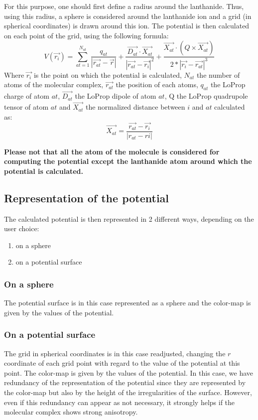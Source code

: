 \documentclass[12pt,a4paper]{article}
\begin{document}
For this purpose, one should first define a radius around the lanthanide. Thus, using this radius, a sphere is considered around the lanthanide ion and a grid (in spherical coordinates) is drawn around this ion. The potential is then calculated on each point of the grid, using the following formula:
\begin{equation}
V(\vec{r_i})=\sum_{at=1}^{N_{at}} \frac{q_{at}}{|\vec{r_{at}}-\vec{r}|} + \frac{\vec{D_{at}}\cdot{}\vec{X_{at}}}{|\vec{r_{at}}-\vec{r_i}|^2} + \frac{\vec{X_{at}}\cdot{}(Q\times\vec{X_{at}})}{2*|\vec{r_i}-\vec{r_{at}}|^3}
\end{equation}
Where $\vec{r_i}$ is the point on which the potential  is calculated, $N_{at}$ the number of atoms of the molecular complex, $\vec{r_{at}}$ the position of each atoms, $q_{at}$ the LoProp charge of atom $at$, $\vec{D_{at}}$ the LoProp dipole of atom $at$, Q the LoProp quadrupole tensor of atom $at$ and $\vec{X_{at}}$ the normalized distance between $i$ and $at$ calculated as:
\begin{equation}
\vec{X_{at}}=\frac{\vec{r_{at}}-\vec{r_i}}{|r_{{at}}-r{i}|}
\end{equation}

\textbf{Please not that all the atom of the molecule is considered for computing the potential except the lanthanide atom around which the potential is calculated.}

\subsection{Representation of the potential}
The calculated potential is then represented in 2 different ways, depending on the user choice:
\begin{enumerate}
\item{on a sphere}
\item{on a \og potential surface \fg{} } 
\end{enumerate}
\subsubsection{On a sphere}
The potential surface is in this case represented as a sphere and the color-map is given by the values of the potential.
\subsubsection{On a \og potential surface \fg{}}
The grid in spherical coordinates is in this case readjusted, changing the $r$  coordinate of each grid point with regard to the value of the potential at this point. The color-map is given by the values of the potential. In this case, we have redundancy of the representation of the potential since they are represented by the color-map but also by the height of the irregularities of the surface. However, even if this redundancy can appear as not necessary, it strongly helps if the molecular complex shows strong anisotropy.
\end{document}
